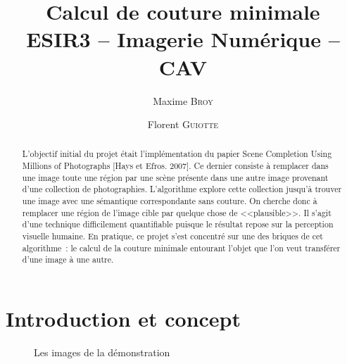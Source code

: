 \documentclass[a4paper]{article}
\title{Calcul de couture minimale \\ {\large ESIR3 -- Imagerie Numérique -- CAV}}
\author{Maxime \textsc{Broy} \and Florent \textsc{Guiotte}}
\begin{document}
\maketitle 
\begin{abstract}
L'objectif initial du projet était l'implémentation du papier Scene Completion Using Millions of Photographs [Hays et Efros. 2007]. 
Ce dernier consiste à remplacer dans une image toute une région par une scène présente dans une autre image provenant d'une collection de photographies. 
L'algorithme explore cette collection jusqu'à trouver une image avec une sémantique correspondante sans couture.
On cherche donc à remplacer une région de l'image cible par quelque chose de <<plausible>>. 
Il s'agit d'une technique difficilement quantifiable puisque le résultat repose sur la perception visuelle humaine. 
En pratique, ce projet s'est concentré sur une des briques de cet algorithme~: 
le calcul de la couture minimale entourant l'objet que l'on veut transférer d'une image à une autre. 
\end{abstract}

\tableofcontents

\section{Introduction et concept}               

\begin{figure}[!ht]%
    \centering
    \hspace{0.030\textwidth}
    \caption{Les images de la démonstration}
    \label{pres}
\end{figure}
\end{document}
